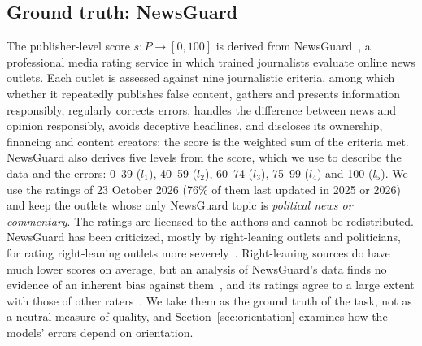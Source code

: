 \documentclass[11pt,a4paper]{article}
\begin{document}
\subsection{Ground truth: NewsGuard}\label{sec:labels}
The publisher-level score $s: P \rightarrow [0, 100]$ is derived from NewsGuard~\cite{newsguard}, a professional media
rating service in which trained journalists evaluate online news outlets. Each outlet is assessed against nine
journalistic criteria, among which whether it repeatedly publishes false content, gathers and presents information
responsibly, regularly corrects errors, handles the difference between news and opinion responsibly, avoids deceptive
headlines, and discloses its ownership, financing and content creators; the score is the weighted sum of the criteria
met. NewsGuard also derives five levels from the score, which we use to describe the data and the errors:
0--39 ($l_1$), 40--59 ($l_2$), 60--74 ($l_3$), 75--99 ($l_4$) and 100 ($l_5$). We use the ratings of 23 October 2026 (76\% of them last updated in 2025 or 2026) and keep the outlets whose only NewsGuard topic is \emph{political news or commentary}. The ratings are licensed to the
authors and cannot be redistributed. NewsGuard has been criticized, mostly by right-leaning outlets and politicians, for
rating right-leaning outlets more severely~\cite{oremus2024newsguard}. Right-leaning sources do have much lower scores on
average, but an analysis of NewsGuard's data finds no evidence of an inherent bias against them~\cite{luhring2025best},
and its ratings agree to a large extent with those of other raters~\cite{lin2023high}. We take them as the ground truth of the task, not as a neutral
measure of quality, and Section~\ref{sec:orientation} examines how the models' errors depend on orientation.
\end{document}
